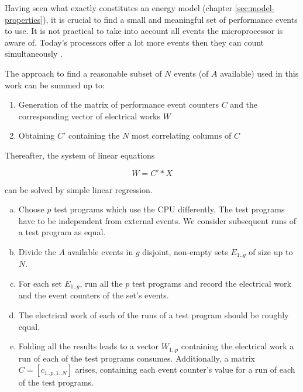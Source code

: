 \label{sec:min-events}

Having seen  what exactly constitutes an energy model (chapter
\ref{sec:model-properties}), it is crucial to find a small and meaningful set of
performance events to use. It is not practical to take into account all events
the microprocessor is aware of. Today's processors offer a lot more events then
they can count simultaneously \cite{intel2011softdev1}.

The approach to find a reasonable subset of $N$ events (of $A$ available) used
in this work can be summed up to:

\begin{enumerate}

\item Generation of the matrix of performance event counters $C$ and
the corresponding vector of electrical works $W$

\item Obtaining $C'$ containing the $N$ most correlating columns of $C$

\end{enumerate}

Thereafter, the system of linear equations

\begin{equation}
W = C' * X
\end{equation}

can be solved by simple linear regression.



\begin{enumerate}[(a)]

\item Choose $p$ test programs which use the CPU differently. The test
programs have to be independent from external events. We consider subsequent
runs of a test program as equal.

\item Divide the $A$ available events in $g$ disjoint, non-empty sets $E_{1..g}$
of size up to $N$.

\item For each set $E_{1..g}$, run all the $p$ test programs and record the
electrical work and the event counters of the set's events.

\item The electrical work of each of the runs of a test program should be
roughly equal.

\item Folding all the results leads to a vector $W_{1..p}$ containing the
electrical work a run of each of the test programs consumes. Additionally, a
matrix $C = [c_{1..p,1..N}]$ arises, containing each event counter's value for a
run of each of the test programs.

\end{enumerate}

